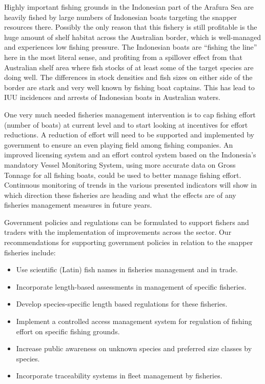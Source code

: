 Highly important fishing grounds in the Indonesian part of the Arafura Sea are heavily fished by large numbers of Indonesian boats targeting the snapper resources there. Possibly the only reason that this fishery is still profitable is the huge amount of shelf habitat across the Australian border, which is well-managed and experiences low fishing pressure. The Indonesian boats are ``fishing the line'' here in the most literal sense, and profiting from a spillover effect from that Australian shelf area where fish stocks of at least some of the target species are doing well. The differences in stock densities and fish sizes on either side of the border are stark and very well known by fishing boat captains. This has lead to IUU incidences and arrests of Indonesian boats in Australian waters.

One very much needed fisheries management intervention is to cap fishing effort (number of boats) at current level and to start looking at incentives for effort reductions. A reduction of effort will need to be supported and implemented by government to ensure an even playing field among fishing companies. An improved licensing system and an effort control system based on the Indonesia's mandatory Vessel Monitoring System, using more accurate data on Gross Tonnage for all fishing boats, could be used to better manage fishing effort. Continuous monitoring of trends in the various presented indicators will show in which direction these fisheries are heading and what the effects are of any fisheries management measures in future years.

Government policies and regulations can be formulated to support fishers and traders with the implementation of improvements across the sector. Our recommendations for supporting government policies in relation to the snapper fisheries include:
\parskip=1pt
\begin{itemize}[noitemsep,topsep=0pt,parsep=0pt,partopsep=0pt]
\item Use scientific (Latin) fish names in fisheries management and in trade.
\item Incorporate length-based assessments in management of specific fisheries.
\item Develop species-specific length based regulations for these fisheries.
\item Implement a controlled access management system for regulation of fishing effort on specific fishing grounds.
\item Increase public awareness on unknown species and preferred size classes by species.
\item Incorporate traceability systems in fleet management by fisheries.
\end{itemize}

